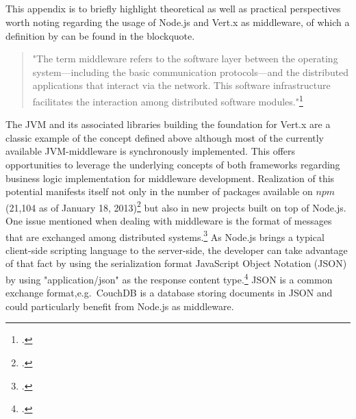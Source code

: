 \newpage \begin{appendices} 
\appendixtocon %

\appendixpage %

\subsection*{\listappendixname}
\listofappendices

\newpage

\begin{subappendices}
\renewcommand{\setthesubsection}{\arabic{subsection}:}%


\label{middleware}

This appendix is to briefly highlight theoretical as well as practical perspectives worth noting regarding the usage of Node.js and Vert.x as middleware, of which a definition by \citeauthor{Geihs_2001} can be found in the blockquote.

\begin{quotation}
"The term middleware refers to the software layer between the operating system—including the basic communication protocols—and the distributed applications that interact via the network. This software infrastructure facilitates the
interaction among distributed software modules."\footcite[][]{Geihs_2001}
\end{quotation}

The JVM and its associated libraries building the foundation for Vert.x are a classic example of the concept defined above although most of the currently available JVM-middleware is synchronously implemented. This offers opportunities to leverage the underlying concepts of both frameworks regarding business logic implementation for middleware development. Realization of this potential manifests itself not only in the number of packages available on $npm$ (21,104 as of January 18, 2013)\footcite[Cf.][]{node_packages} but also in new projects built on top of Node.js.\\

One issue mentioned when dealing with middleware is the format of messages that are exchanged among distributed systems.\footcite[149]{Tannenbaum_2007} As Node.js brings a typical client-side scripting language to the server-side, the developer can take advantage of that fact by using the serialization format JavaScript Object Notation (JSON) by using "application/json" as the response content type.\footcite[Cf.][]{rfc4627} JSON is a common exchange format,e.g.\ CouchDB is a database storing documents in JSON and could particularly benefit from Node.js as middleware.\\


\end{subappendices}
\end{appendices}
